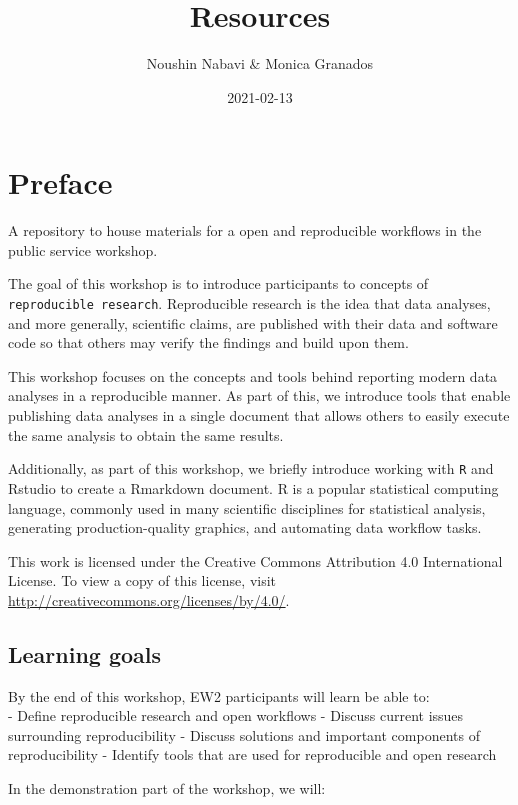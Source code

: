 \documentclass[
]{book}
\title{Resources}
\author{Noushin Nabavi \& Monica Granados}
\date{2021-02-13}
\begin{document}
\maketitle

{
\setcounter{tocdepth}{1}
\tableofcontents
}
\hypertarget{preface}{%
\chapter{Preface}\label{preface}}

A repository to house materials for a open and reproducible workflows in the public service workshop.

The goal of this workshop is to introduce participants to concepts of \texttt{reproducible\ research}.
Reproducible research is the idea that data analyses, and more generally, scientific claims, are published with their data and software code so that others may verify the findings and build upon them.

This workshop focuses on the concepts and tools behind reporting modern data analyses in a reproducible manner. As part of this, we introduce tools that enable publishing data analyses in a single document that allows others to easily execute the same analysis to obtain the same results.

Additionally, as part of this workshop, we briefly introduce working with \texttt{R} and Rstudio to create a Rmarkdown document. R is a popular statistical computing language, commonly used in many scientific disciplines for statistical analysis, generating production-quality graphics, and automating data workflow tasks.

This work is licensed under the Creative Commons Attribution 4.0 International License.
To view a copy of this license, visit \url{http://creativecommons.org/licenses/by/4.0/}.

\hypertarget{learning-goals}{%
\section{Learning goals}\label{learning-goals}}

By the end of this workshop, EW2 participants will learn be able to:\\
- Define reproducible research and open workflows
- Discuss current issues surrounding reproducibility
- Discuss solutions and important components of reproducibility
- Identify tools that are used for reproducible and open research

In the demonstration part of the workshop, we will:
\end{document}
